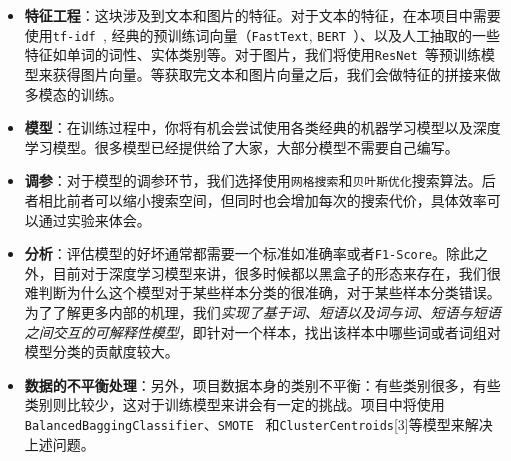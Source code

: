 \begin{itemize}
    \item \textbf{特征工程}：这块涉及到文本和图片的特征。对于文本的特征，在本项目中需要使用\texttt{tf-idf~\cite{paik2013novel}}, 经典的预训练词向量（\texttt{FastText}, \texttt{BERT~\cite{DBLP:journals/corr/abs-1810-04805}}）、以及人工抽取的一些特征如单词的词性、实体类别等。对于图片，我们将使用\texttt{ResNet~\cite{DBLP:journals/corr/HeZRS15}}等预训练模型来获得图片向量。等获取完文本和图片向量之后，我们会做特征的拼接来做多模态的训练。 
    \item \textbf{模型}：在训练过程中，你将有机会尝试使用各类经典的机器学习模型以及深度学习模型。很多模型已经提供给了大家，大部分模型不需要自己编写。  
    \item \textbf{调参}：对于模型的调参环节，我们选择使用\texttt{网格搜索}和\texttt{贝叶斯优化}搜索算法。后者相比前者可以缩小搜索空间，但同时也会增加每次的搜索代价，具体效率可以通过实验来体会。
    \item \textbf{分析}：评估模型的好坏通常都需要一个标准如准确率或者\texttt{F1-Score}。除此之外，目前对于深度学习模型来讲，很多时候都以黑盒子的形态来存在，我们很难判断为什么这个模型对于某些样本分类的很准确，对于某些样本分类错误。为了了解更多内部的机理，我们\textit{实现了基于词、短语以及词与词、短语与短语之间交互的可解释性模型}，即针对一个样本，找出该样本中哪些词或者词组对模型分类的贡献度较大。
    \item \textbf{数据的不平衡处理}：另外，项目数据本身的类别不平衡：有些类别很多，有些类别则比较少，这对于训练模型来讲会有一定的挑战。项目中将使用\texttt{BalancedBaggingClassifier}、\texttt{SMOTE~\cite{DBLP:journals/corr/abs-1106-1813}} 和\texttt{ClusterCentroids}[3]等模型来解决上述问题。
\end{itemize}








